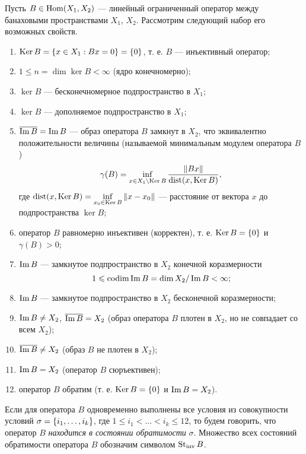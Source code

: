 \begin{definition}\label{def:stinv}
    Пусть $B \in \operatorname{Hom}(X_1, X_2)$ --- линейный ограниченный оператор между банаховыми пространствами $X_1$, $X_2$. Рассмотрим следующий набор его возможных свойств.
    \begin{enumerate}[label={\arabic*)}]
        \setlength\itemsep{0em}
        \item $\operatorname{Ker} B = \left\{x \in X_1 : Bx = 0\right\} = \left\{0\right\}$, т. е. $B$ --- инъективный оператор;
        \item $1 \leq n = \dim \ker B < \infty$ (ядро конечномерно);
        \item $\ker B$ --- бесконечномерное подпространство в $X_1$;
        \item $\ker B$ --- дополняемое подпространство в $X_1$;
        \item $\overline{\operatorname{Im} B} = \operatorname{Im} B$ --- образ оператора $B$ замкнут в $X_2$, что эквивалентно положительности величины (называемой минимальным модулем оператора $B$)
        \[ \gamma(B) = \inf_{x \in X_1 \setminus \operatorname{Ker} B} \frac{\left\|Bx\right\|}{\operatorname{dist} (x, \operatorname{Ker} B)}, \]
        где $\operatorname{dist} (x, \operatorname{Ker} B) = \inf\limits_{x_0 \in \operatorname{Ker} B} \left\|x - x_0\right\|$ --- расстояние от вектора $x$ до подпространства $\ker B$;
        \item оператор $B$ равномерно инъективен (корректен), т. е. $\operatorname{Ker} B = \left\{0\right\}$ и $\gamma(B) > 0$;
        \item $\operatorname{Im} B$ --- замкнутое подпространство в $X_2$ конечной коразмерности
        \[ 1 \leqslant \operatorname{codim} \operatorname{Im} B = \dim X_2 / \operatorname{Im} B < \infty; \]
        \item $\operatorname{Im} B$ --- замкнутое подпространство в $X_2$ бесконечной коразмерности;
        \item $\operatorname{Im} B \neq X_2$, $\overline{\operatorname{Im} B} = X_2$ (образ оператора $B$ плотен в $X_2$, но не совпадает со всем $X_2$);
        \item $\overline{\operatorname{Im} B} \neq X_2$ (образ $B$ не плотен в $X_2$);
        \item $\operatorname{Im} B = X_2$ (оператор $B$ сюръективен);
        \item оператор $B$ обратим (т. е. $\operatorname{Ker} B = \left\{0\right\}$ и $\operatorname{Im} B = X_2$).
    \end{enumerate}
    Если для оператора $B$ одновременно выполнены все условия из совокупности условий $\sigma \hm= \menge{i_1, \dotsc, i_k}$, где $1 \leq i_1 < \dotsc < i_k \leq 12$, то будем говорить, что оператор $B$ \emph{находится в состоянии обратимости} $\sigma$. Множество всех состояний обратимости оператора $B$ обозначим символом $\operatorname{St_{inv}} B$.
\end{definition}

